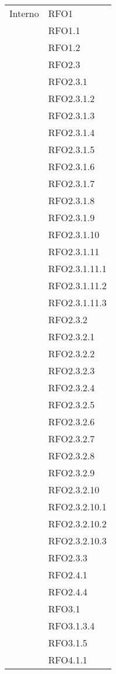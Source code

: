 \begin{center}
\begin{longtable}{ | >{\centering\arraybackslash}m{5cm} | >{\centering\arraybackslash}m{5cm} | }
        Interno & RFO1\\
            & RFO1.1 \\
            & RFO1.2 \\
            & RFO2.3 \\
            & RFO2.3.1 \\
            & RFO2.3.1.2 \\
            & RFO2.3.1.3 \\
            & RFO2.3.1.4 \\
            & RFO2.3.1.5 \\
            & RFO2.3.1.6 \\
            & RFO2.3.1.7 \\
            & RFO2.3.1.8 \\
            & RFO2.3.1.9 \\
            & RFO2.3.1.10 \\
            & RFO2.3.1.11 \\
            & RFO2.3.1.11.1 \\
            & RFO2.3.1.11.2 \\
            & RFO2.3.1.11.3 \\
            & RFO2.3.2 \\
            & RFO2.3.2.1 \\
            & RFO2.3.2.2 \\
            & RFO2.3.2.3 \\
            & RFO2.3.2.4 \\
            & RFO2.3.2.5 \\
            & RFO2.3.2.6 \\
            & RFO2.3.2.7 \\
            & RFO2.3.2.8 \\
            & RFO2.3.2.9 \\
            & RFO2.3.2.10 \\
            & RFO2.3.2.10.1 \\
            & RFO2.3.2.10.2 \\
            & RFO2.3.2.10.3 \\
            & RFO2.3.3 \\
            & RFO2.4.1 \\
            & RFO2.4.4 \\
            & RFO3.1 \\
            & RFO3.1.3.4 \\
            & RFO3.1.5 \\
            & RFO4.1.1 \\

\end{longtable}
\end{center}
